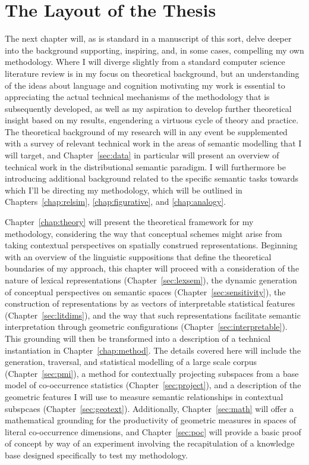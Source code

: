 \section{The Layout of the Thesis}
The next chapter will, as is standard in a manuscript of this sort, delve deeper into the background supporting, inspiring, and, in some cases, compelling my own methodology.  Where I will diverge slightly from a standard computer science literature review is in my focus on theoretical background, but an understanding of the ideas about language and cognition motivating my work is essential to appreciating the actual technical mechanisms of the methodology that is subsequently developed, as well as my aspiration to develop further theoretical insight based on my results, engendering a virtuous cycle of theory and practice.  The theoretical background of my research will in any event be supplemented with a survey of relevant technical work in the areas of semantic modelling that I will target, and Chapter~\ref{sec:data} in particular will present an overview of technical work in the distributional semantic paradigm.  I will furthermore be introducing additional background related to the specific semantic tasks towards which I'll be directing my methodology, which will be outlined in Chapters~\ref{chap:relsim}, \ref{chap:figurative}, and \ref{chap:analogy}.

Chapter~\ref{chap:theory} will present the theoretical framework for my methodology, considering the way that conceptual schemes might arise from taking contextual perspectives on spatially construed representations.  Beginning with an overview of the linguistic suppositions that define the theoretical boundaries of my approach, this chapter will proceed with a consideration of the nature of lexical representations (Chapter~\ref{sec:lexsem}), the dynamic generation of conceptual perspectives on semantic spaces (Chapter~\ref{sec:sensitivity}), the construction of representations by as vectors of interpretable statistical features (Chapter~\ref{sec:litdims}), and the way that such representations facilitate semantic interpretation through geometric configurations (Chapter~\ref{sec:interpretable}).  This grounding will then be transformed into a description of a technical instantiation in Chapter~\ref{chap:method}.  The details covered here will include the generation, traversal, and statistical modelling of a large scale corpus (Chapter~\ref{sec:pmi}), a method for contextually projecting subspaces from a base model of co-occurrence statistics (Chapter~\ref{sec:project}), and a description of the geometric features I will use to measure semantic relationships in contextual subspcaes (Chapter~\ref{sec:geotext}).  Additionally, Chapter~\ref{sec:math} will offer a mathematical grounding for the productivity of geometric measures in spaces of literal co-occurrence dimensions, and Chapter~\ref{sec:poc} will provide a basic proof of concept by way of an experiment involving the recapitulation of a knowledge base designed specifically to test my methodology.

